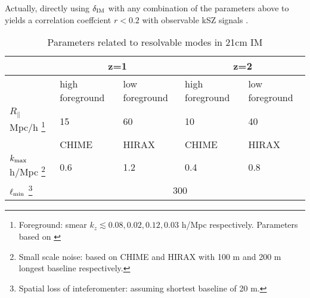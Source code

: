 Actually, directly using $\delta_\mathrm{IM}$ with any combination of the parameters above to yields a correlation coeffcient $r<0.2$ with observable kSZ signals .
\begin{table}
\begin{tabular}{|m{2cm}|m{1.5cm}|m{1.5cm}|m{1.5cm}|m{1.5cm}|}
    \hline
     & \multicolumn{2}{|c|}{z=1} &\multicolumn{2}{|c|}{z=2}\\
     \hline
     & high foreground &low foreground&high foreground& low foreground\\
     \cline{2-5}
     $R_\parallel$ Mpc/h
     \footnote{Foreground: smear $k_z\lesssim 0.08,0.02,0.12,0.03$ h/Mpc respectively. Parameters based on \cite{2013ApJ...763L..20M,Switzer13,15Shaw}}
      & 15 & 60 & 10 & 40 \\
     \hline
     & CHIME & HIRAX & CHIME &HIRAX\\
     \cline{2-5}
     $k_\mathrm{max}$ h/Mpc 
     \footnote{Small scale noise: based on CHIME\cite{2014CHIME} and HIRAX\cite{HIRAX} 
     with 100 m and 200 m longest baseline respectively.}
     & 0.6 & 1.2 & 0.4 & 0.8 \\
     \hline
     $\ell_\mathrm{min}$
     \footnote{Spatial loss of inteferomenter: assuming shortest baseline of 20 m.}
     & \multicolumn{4}{|c|}{300} \\
     \hline
\end{tabular}
     \caption{Parameters related to resolvable modes in 21cm IM}
     \label{tab:para}
\end{table}
